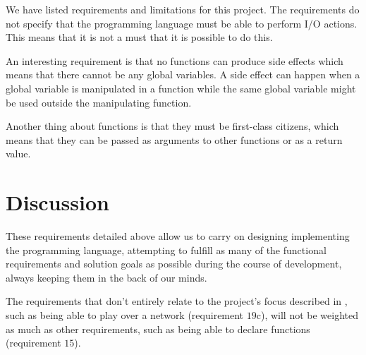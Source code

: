 We have listed requirements and limitations for this project. The requirements
do not specify that the programming language must be able to perform I/O
actions. This means that it is not a must that it is possible to do this.

An interesting requirement is that no functions can produce side effects which
means that there cannot be any global variables. A side effect can happen when a
global variable is manipulated in a function while the same global variable
might be used outside the manipulating function. 

Another thing about functions is that they must be first-class citizens, which
means that they can be passed as arguments to other functions or as a return
value.

\section{Discussion}
These requirements detailed above allow us to carry on designing
implementing the programming language, attempting to fulfill as many of
the functional requirements and solution goals as possible during the
course of development, always keeping them in the back of our minds.

The requirements that don't entirely relate to the project's focus
described in , such as being able to play
over a network (requirement $19$c), will not be weighted as much
as other requirements, such as being able to declare functions
(requirement $15$).
